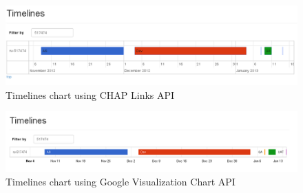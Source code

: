\begin{figure}[ht!]
	\centering
   	\includegraphics[width=1\textwidth]{./resources/timeline_chap.png}
   	\caption{Timelines chart using CHAP Links API}
   	\label{f_timeline_chap}
\end{figure}

\begin{figure}[ht!]
	\centering
   	\includegraphics[width=1\textwidth]{./resources/timeline_google.png}
   	\caption{Timelines chart using Google Visualization Chart API}
   	\label{f_timeline_google}
\end{figure} 

